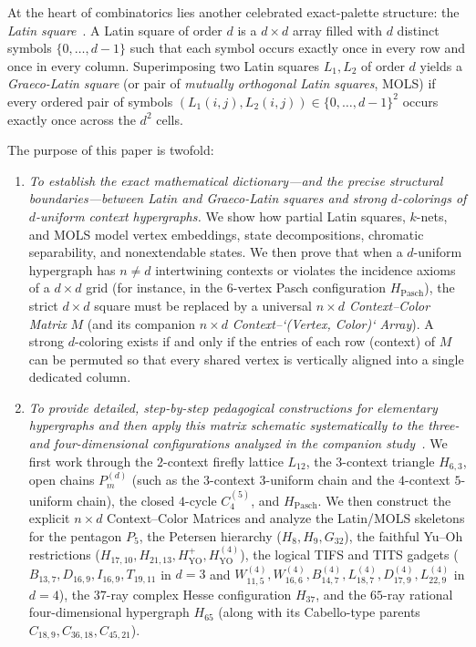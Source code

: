 \documentclass[aps,pra,reprint,superscriptaddress,longbibliography,nofootinbib,floatfix,10pt]{revtex4-2}
\theoremstyle{definition}\newtheorem{definition}[theorem]{Definition}
\theoremstyle{remark}\newtheorem{remark}[theorem]{Remark}
\newcommand{\YO}{\mathrm{YO}}\newcommand{\ip}[2]{\langle #1,#2\rangle}
\begin{document}
At the heart of combinatorics lies another celebrated exact-palette structure: the \emph{Latin square}~\cite{Euler60,hall-2015}. A Latin square of order $d$ is a $d\times d$ array filled with $d$ distinct symbols $\{0,\ldots,d-1\}$ such that each symbol occurs exactly once in every row and once in every column. Superimposing two Latin squares $L_1,L_2$ of order $d$ yields a \emph{Graeco-Latin square} (or pair of \emph{mutually orthogonal Latin squares}, MOLS) if every ordered pair of symbols $(L_1(i,j),L_2(i,j))\in\{0,\ldots,d-1\}^2$ occurs exactly once across the $d^2$ cells.

The purpose of this paper is twofold:
\begin{enumerate}
\item \emph{To establish the exact mathematical dictionary—and the precise structural boundaries—between Latin and Graeco-Latin squares and strong $d$-colorings of $d$-uniform context hypergraphs.} We show how partial Latin squares, $k$-nets, and MOLS model vertex embeddings, state decompositions, chromatic separability, and nonextendable states. We then prove that when a $d$-uniform hypergraph has $n\neq d$ intertwining contexts or violates the incidence axioms of a $d\times d$ grid (for instance, in the $6$-vertex Pasch configuration $H_{\mathrm{Pasch}}$), the strict $d\times d$ square must be replaced by a universal \emph{$n\times d$ Context--Color Matrix} $M$ (and its companion $n\times d$ \emph{Context--`(Vertex, Color)` Array}). A strong $d$-coloring exists if and only if the entries of each row (context) of $M$ can be permuted so that every shared vertex is vertically aligned into a single dedicated column.
\item \emph{To provide detailed, step-by-step pedagogical constructions for elementary hypergraphs and then apply this matrix schematic systematically to the three- and four-dimensional configurations analyzed in the companion study~\cite{svozil-2025-color,supplement}.} We first work through the $2$-context firefly lattice $L_{12}$, the $3$-context triangle $H_{6,3}$, open chains $P_m^{(d)}$ (such as the $3$-context $3$-uniform chain and the $4$-context $5$-uniform chain), the closed $4$-cycle $C_4^{(5)}$, and $H_{\mathrm{Pasch}}$. We then construct the explicit $n\times d$ Context--Color Matrices and analyze the Latin/MOLS skeletons for the pentagon $P_5$, the Petersen hierarchy ($H_8,H_9,G_{32}$), the faithful Yu--Oh restrictions ($H_{17,10},H_{21,13},H_{\YO}^+,H_{\YO}^{(4)}$), the logical TIFS and TITS gadgets ($B_{13,7},D_{16,9},I_{16,9},T_{19,11}$ in $d=3$ and $W_{11,5}^{(4)},W_{16,6}^{(4)},B_{14,7}^{(4)},L_{18,7}^{(4)},D_{17,9}^{(4)},L_{22,9}^{(4)}$ in $d=4$), the $37$-ray complex Hesse configuration $H_{37}$, and the $65$-ray rational four-dimensional hypergraph $H_{65}$ (along with its Cabello-type parents $C_{18,9},C_{36,18},C_{45,21}$).
\end{enumerate}
\end{document}
